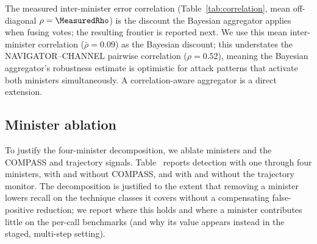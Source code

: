 
The measured inter-minister error correlation (Table~\ref{tab:correlation},
mean off-diagonal $\rho=\MeasuredRho$) is the discount the Bayesian aggregator
applies when fusing votes; the resulting frontier is reported next.
We use this mean inter-minister correlation ($\bar\rho = 0.09$) as the Bayesian
discount; this understates the NAVIGATOR--CHANNEL pairwise correlation
($\rho = 0.52$), meaning the Bayesian aggregator's robustness estimate is
optimistic for attack patterns that activate both ministers simultaneously. A
correlation-aware aggregator is a direct extension.


\subsection{Minister ablation}
\label{sec:ablation}
To justify the four-minister decomposition, we ablate ministers and the COMPASS
and trajectory signals. Table~\TBD{} reports detection with one through four
ministers, with and without COMPASS, and with and without the trajectory
monitor. The decomposition is justified to the extent that removing a minister
lowers recall on the technique classes it covers without a compensating
false-positive reduction; we report where this holds and where a minister
contributes little on the per-call benchmarks (and why its value appears instead
in the staged, multi-step setting).


